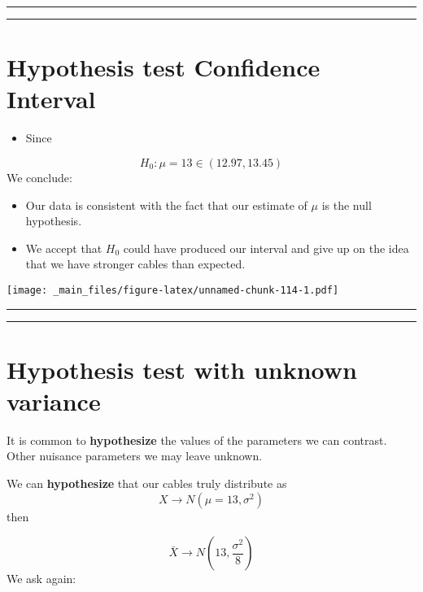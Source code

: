 \documentclass[
]{book}
\providecommand{\tightlist}{%
  \setlength{\itemsep}{0pt}\setlength{\parskip}{0pt}}
\begin{document}
\begin{center}\rule{0.5\linewidth}{0.5pt}\end{center}

\begin{center}\rule{0.5\linewidth}{0.5pt}\end{center}

\hypertarget{hypothesis-test-confidence-interval-1}{%
\section{Hypothesis test Confidence Interval}\label{hypothesis-test-confidence-interval-1}}

\begin{itemize}
\tightlist
\item
  Since
\end{itemize}

\[H_0: \mu=13 \in (12.97,13.45)\]
We conclude:

\begin{itemize}
\item
  Our data is consistent with the fact that our estimate of \(\mu\) is the null hypothesis.
\item
  We accept that \(H_0\) could have produced our interval and give up on the idea that we have stronger cables than expected.
\end{itemize}

\texttt{[image: \_main\_files/figure-latex/unnamed-chunk-114-1.pdf]}

\begin{center}\rule{0.5\linewidth}{0.5pt}\end{center}

\begin{center}\rule{0.5\linewidth}{0.5pt}\end{center}

\hypertarget{hypothesis-test-with-unknown-variance}{%
\section{Hypothesis test with unknown variance}\label{hypothesis-test-with-unknown-variance}}

It is common to \textbf{hypothesize} the values of the parameters we can contrast. Other nuisance parameters we may leave unknown.

We can \textbf{hypothesize} that our cables truly distribute as \[X \rightarrow N(\mu=13, \sigma^2)\] then

\[\bar{X} \rightarrow N(13, \frac{\sigma^2}{8})\]
We ask again:
\end{document}

